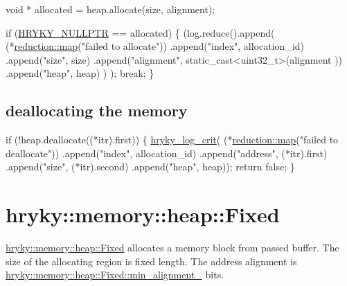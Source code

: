 \begin{DoxyCodeInclude}
                \textcolor{keywordtype}{void} * allocated = heap.allocate(size, alignment);

                \textcolor{keywordflow}{if} (\hyperlink{common_8h_a4cd4ac09cfcdbd6b30ee69afc156e210}{HRYKY_NULLPTR} == allocated) \{
                    (log.reduce().append(
                        (*\hyperlink{namespacehryky_1_1reduction_ac5eae270cf8047b294dc4ff3e5e11a79}{reduction::map}(\textcolor{stringliteral}{"failed to allocate"}))
                        .append(\textcolor{stringliteral}{"index"},       allocation\_id)
                        .append(\textcolor{stringliteral}{"size"},         size)
                        .append(\textcolor{stringliteral}{"alignment"},    static\_cast<uint32\_t>(alignment
      ))
                        .append(\textcolor{stringliteral}{"heap"},         heap)
                        )
                     );
                    \textcolor{keywordflow}{break};
                \}

\end{DoxyCodeInclude}
\hypertarget{hryky_1_1memory_deallocation}{}\subsection{deallocating the memory}\label{hryky_1_1memory_deallocation}

\begin{DoxyCodeInclude}
                \textcolor{keywordflow}{if} (!heap.deallocate((*itr).first)) \{
                    \hyperlink{log__writer__common_8h_a61bcce4d8e91e6fde78ce1be7d9ceac8}{hryky_log_crit}(
                        (*\hyperlink{namespacehryky_1_1reduction_ac5eae270cf8047b294dc4ff3e5e11a79}{reduction::map}(\textcolor{stringliteral}{"failed to deallocate"}))
                        .append(\textcolor{stringliteral}{"index"}, allocation\_id)
                        .append(\textcolor{stringliteral}{"address"}, (*itr).first)
                        .append(\textcolor{stringliteral}{"size"}, (*itr).second)
                        .append(\textcolor{stringliteral}{"heap"}, heap));
                    \textcolor{keywordflow}{return} \textcolor{keyword}{false};
                \}

\end{DoxyCodeInclude}
\hypertarget{hryky_1_1memory_heap_Fixed}{}\section{hryky\-::memory\-::heap\-::\-Fixed}\label{hryky_1_1memory_heap_Fixed}
\hyperlink{classhryky_1_1memory_1_1heap_1_1_fixed}{hryky\-::memory\-::heap\-::\-Fixed} allocates a memory block from passed buffer. The size of the allocating region is fixed length. The address alignment is \hyperlink{classhryky_1_1memory_1_1heap_1_1_fixed_a49ff1ac7fdf4d300ad8006669e670d4ca3b7bf349f23c89c7715a49a6007eed98}{hryky\-::memory\-::heap\-::\-Fixed\-::min\-\_\-alignment\-\_\-} bits.

